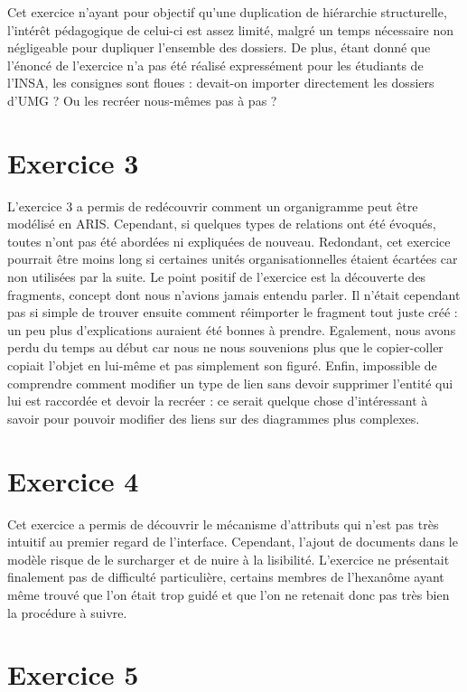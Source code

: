 Cet exercice n'ayant pour objectif qu'une duplication de hiérarchie structurelle, l'intérêt pédagogique de celui-ci est assez limité, malgré un temps nécessaire non négligeable pour dupliquer l'ensemble des dossiers. De plus, étant donné que l'énoncé de l'exercice n'a pas été réalisé expressément pour les étudiants de l'INSA, les consignes sont floues : devait-on importer directement les dossiers d'UMG ? Ou les recréer nous-mêmes pas à pas ?

\section{Exercice 3}

L'exercice 3 a permis de redécouvrir comment un organigramme peut être modélisé en ARIS. Cependant, si quelques types de relations ont été évoqués, toutes n'ont pas été abordées ni expliquées de nouveau. Redondant, cet exercice pourrait être moins long si certaines unités organisationnelles étaient écartées car non utilisées par la suite. Le point positif de l'exercice est la découverte des \og{}fragments\tg{}, concept dont nous n'avions jamais entendu parler. Il n'était cependant pas si simple de trouver ensuite comment réimporter le fragment tout juste créé : un peu plus d’explications auraient été bonnes à prendre. Egalement, nous avons perdu du temps au début car nous ne nous souvenions plus que le copier-coller copiait l'objet en lui-même et pas simplement son figuré. Enfin, impossible de comprendre comment modifier un type de lien sans devoir supprimer l'entité qui lui est raccordée et devoir la recréer : ce serait quelque chose d'intéressant à savoir pour pouvoir modifier des liens sur des diagrammes plus complexes.

\section{Exercice 4}

Cet exercice a permis de découvrir le mécanisme d’attributs qui n'est pas très intuitif au premier regard de l'interface. Cependant, l'ajout de documents dans le modèle risque de le surcharger et de nuire à la lisibilité. L'exercice ne présentait finalement pas de difficulté particulière, certains membres de l'hexanôme ayant même trouvé que l'on était trop guidé et que l'on ne retenait donc pas très bien la procédure à suivre.

\section{Exercice 5}


